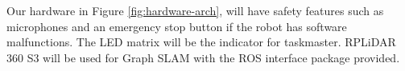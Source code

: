 Our hardware in Figure \ref{fig:hardware-arch}, will have safety features such as microphones and an emergency stop button if the robot has software malfunctions. The LED matrix will be the indicator for taskmaster. RPLiDAR 360 S3 will be used for Graph SLAM with the ROS interface package provided. 
